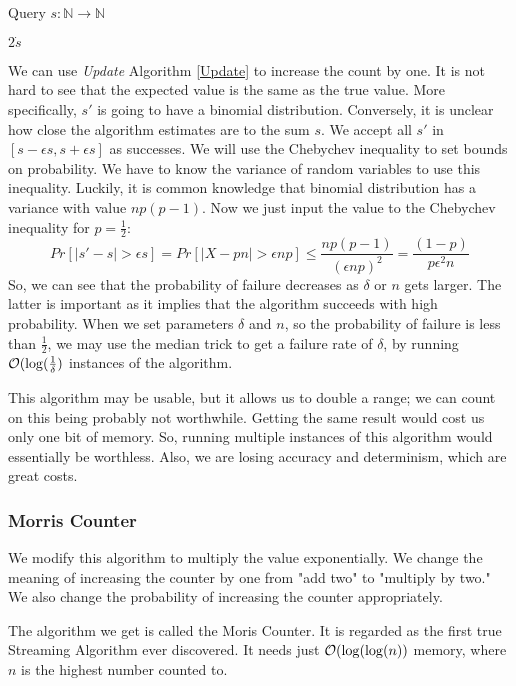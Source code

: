 \begin{algorithm}
\caption{Query $s : \mathbb{N} \to \mathbb{N}$}
\begin{algorithmic}[1]
    \State \Return $2 \dot s$
\EndFunction
\end{algorithmic}
\end{algorithm}
We can use \textit{Update} Algorithm \ref{Update} to increase the count by one. It is not hard to see that the expected value is the same as the true value. More specifically, $s'$ is going to have a binomial distribution. Conversely, it is unclear how close the algorithm estimates are to the sum $s$. We accept all $s'$ in $[s - \epsilon s, s + \epsilon s]$ as successes. We will use the Chebychev inequality to set bounds on probability. We have to know the variance of random variables to use this inequality. Luckily, it is common knowledge that binomial distribution has a variance with value $np(p-1)$.
Now we just input the value to the Chebychev inequality for $p = \frac{1}{2}$:
$$
Pr[|s' - s| > \epsilon s]= Pr[|X-pn| > \epsilon np] \leq \frac{np(p-1)}{(\epsilon np)^2} = \frac{(1-p)}{p\epsilon^2n}
$$
So, we can see that the probability of failure decreases as $\delta$ or $n$ gets larger. The latter is important as it implies that the algorithm succeeds with high probability. When we set parameters $\delta$ and $n$, so the probability of failure is less than $\frac{1}{2}$, we may use the median trick to get a failure rate of $\delta$, by running $\mathcal{O}(\log(\frac{1}{\delta})$ instances of the algorithm. 

This algorithm may be usable, but it allows us to double a range; we can count on this being probably not worthwhile. Getting the same result would cost us only one bit of memory. So, running multiple instances of this algorithm would essentially be worthless. Also, we are losing accuracy and determinism, which are great costs. 

\subsubsection{Morris Counter}

We modify this algorithm to multiply the value exponentially. We change the meaning of increasing the counter by one from "add two" to "multiply by two." We also change the probability of increasing the counter appropriately.

The algorithm we get is called the Moris Counter. It is regarded as the first true Streaming Algorithm ever discovered. \cite{10.1145/359619.359627} It needs just $\mathcal{O}(\log(\log(n))$ memory, where $n$ is the highest number counted to.

